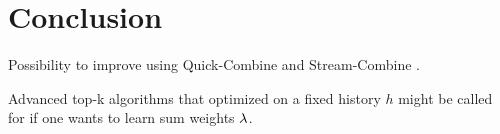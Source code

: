 \chapter{Conclusion}

\begin{draft}
Possibility to improve using Quick-Combine \parencite{Guentzer2000} and
Stream-Combine \parencite{Guentzer2001}.

Advanced top-k algorithms that optimized on a fixed history $h$ might be called
for if one wants to learn sum weights $\lambda$.
\end{draft}
